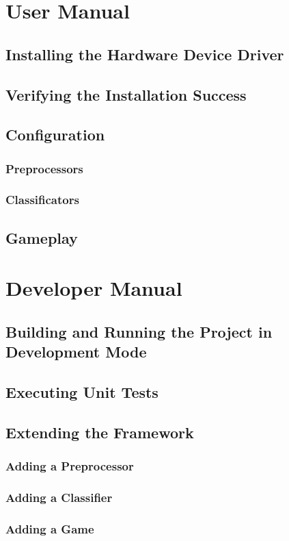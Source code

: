 \documentclass[fontsize=12pt,a4paper,draft]{scrartcl}[2018/05/07]
\begin{document}
\appendix
\section{User Manual}
\subsection{Installing the Hardware Device Driver}
\subsection{Verifying the Installation Success}
\subsection{Configuration}
\subsubsection{Preprocessors}
\subsubsection{Classificators}
\subsection{Gameplay}
\section{Developer Manual}
\subsection{Building and Running the Project in Development Mode}
\subsection{Executing Unit Tests}
\subsection{Extending the Framework}
\subsubsection{Adding a Preprocessor}
\subsubsection{Adding a Classifier}
\subsubsection{Adding a Game}
\end{document}
